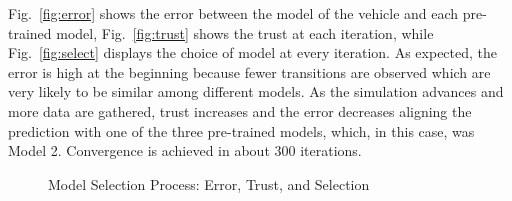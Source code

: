 \documentclass[letterpaper, 10 pt, conference]{ieeeconf}  %
\begin{document}
Fig.~\ref{fig:error} shows the error between the model of the vehicle and each pre-trained model, Fig.~\ref{fig:trust} shows the trust at each iteration, while Fig.~\ref{fig:select} displays the choice of model at every iteration. As expected, the error is high at the beginning because fewer transitions are observed which are very likely to be similar among different models. As the simulation advances and more data are gathered, trust increases and the error decreases aligning the prediction with one of the three pre-trained models, which, in this case, was Model 2. Convergence is achieved in about 300 iterations.  


\begin{figure}[h]
	\centering
	\vspace{-5pt}
	\caption{Model Selection Process: Error, Trust, and Selection}
	\label{fig:fitprocess}
	\vspace{-5pt}
\end{figure}
\end{document}
